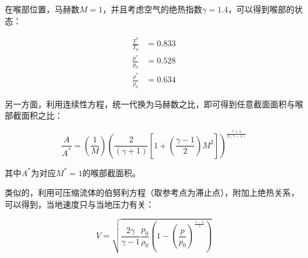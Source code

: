 在喉部位置，马赫数$M=1$，并且考虑空气的绝热指数$\gamma=1.4$，可以得到喉部的状态：

\begin{align*}
\frac{T^{*}}{T_{0}}&=0.833 \\ 
\frac{p^{*}}{p_{0}}&=0.528 \\ 
\frac{\rho^{*}}{\rho_{0}}&=0.634
\end{align*}

另一方面，利用连续性方程，统一代换为马赫数之比，即可得到任意截面面积与喉部截面积之比：

\begin{equation*}
    \frac{A}{A^{*}}=\left(\frac{1}{M}\right)\left(\frac{2}{(\gamma+1)}\left[1+\left(\frac{\gamma-1}{2}\right) M^{2}\right]\right)^{\frac{\gamma+1}{2(\gamma-1)}}
\end{equation*}

其中$A^*$为对应$M^*=1$的喉部截面积。

类似的，利用可压缩流体的伯努利方程（取参考点为滞止点），附加上绝热关系，可以得到，当地速度只与当地压力有关：

\begin{equation*}
    V=\sqrt{\frac{2 \gamma}{\gamma-1} \frac{p_{0}}{\rho_{0}}\left(1-\left(\frac{p}{p_{0}}\right)^{\frac{\gamma-1}{\gamma}}\right)}
\end{equation*}

